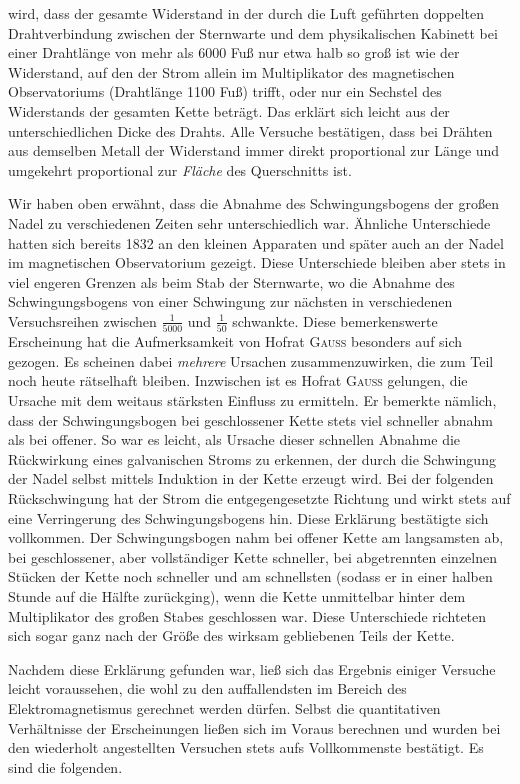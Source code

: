 wird, dass der gesamte Widerstand in der durch die Luft geführten doppelten Drahtverbindung zwischen der Sternwarte und dem physikalischen Kabinett bei einer Drahtlänge von mehr als 6000 Fuß nur etwa halb so groß ist wie der Widerstand, auf den der Strom allein im Multiplikator des magnetischen Observatoriums (Drahtlänge 1100 Fuß) trifft, oder nur ein Sechstel des Widerstands der gesamten Kette beträgt. Das erklärt sich leicht aus der unterschiedlichen Dicke des Drahts. Alle Versuche bestätigen, dass bei Drähten aus demselben Metall der Widerstand immer direkt proportional zur Länge und umgekehrt proportional zur \textit{Fläche} des Querschnitts ist.

Wir haben oben erwähnt, dass die Abnahme des Schwingungsbogens der großen Nadel zu verschiedenen Zeiten sehr unterschiedlich war. Ähnliche Unterschiede hatten sich bereits 1832 an den kleinen Apparaten und später auch an der Nadel im magnetischen Observatorium gezeigt. Diese Unterschiede bleiben aber stets in viel engeren Grenzen als beim Stab der Sternwarte, wo die Abnahme des Schwingungsbogens von einer Schwingung zur nächsten in verschiedenen Versuchsreihen zwischen $\frac{1}{5000}$ und $\frac{1}{50}$ schwankte. Diese bemerkenswerte Erscheinung hat die Aufmerksamkeit von Hofrat \textsc{Gauss} besonders auf sich gezogen. Es scheinen dabei \textit{mehrere} Ursachen zusammenzuwirken, die zum Teil noch heute rätselhaft bleiben. Inzwischen ist es Hofrat \textsc{Gauss} gelungen, die Ursache mit dem weitaus stärksten Einfluss zu ermitteln. Er bemerkte nämlich, dass der Schwingungsbogen bei geschlossener Kette stets viel schneller abnahm als bei offener. So war es leicht, als Ursache dieser schnellen Abnahme die Rückwirkung eines galvanischen Stroms zu erkennen, der durch die Schwingung der Nadel selbst mittels Induktion in der Kette erzeugt wird. Bei der folgenden Rückschwingung hat der Strom die entgegengesetzte Richtung und wirkt stets auf eine Verringerung des Schwingungsbogens hin. Diese Erklärung bestätigte sich vollkommen. Der Schwingungsbogen nahm bei offener Kette am langsamsten ab, bei geschlossener, aber vollständiger Kette schneller, bei abgetrennten einzelnen Stücken der Kette noch schneller und am schnellsten (sodass er in einer halben Stunde auf die Hälfte zurückging), wenn die Kette unmittelbar hinter dem Multiplikator des großen Stabes geschlossen war. Diese Unterschiede richteten sich sogar ganz nach der Größe des wirksam gebliebenen Teils der Kette.

Nachdem diese Erklärung gefunden war, ließ sich das Ergebnis einiger Versuche leicht voraussehen, die wohl zu den auffallendsten im Bereich des Elektromagnetismus gerechnet werden dürfen. Selbst die quantitativen Verhältnisse der Erscheinungen ließen sich im Voraus berechnen und wurden bei den wiederholt angestellten Versuchen stets aufs Vollkommenste bestätigt. Es sind die folgenden.

